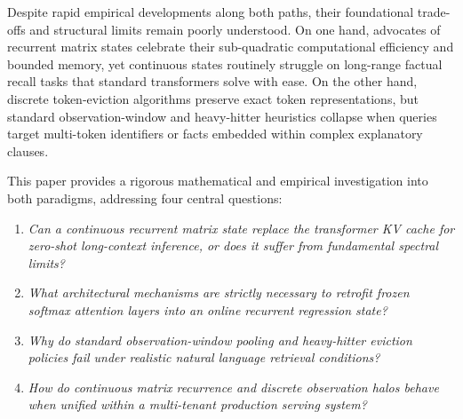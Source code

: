 \documentclass[11pt,a4paper]{article}
\begin{document}
Despite rapid empirical developments along both paths, their foundational trade-offs and structural limits remain poorly understood. On one hand, advocates of recurrent matrix states celebrate their sub-quadratic computational efficiency and bounded memory, yet continuous states routinely struggle on long-range factual recall tasks that standard transformers solve with ease. On the other hand, discrete token-eviction algorithms preserve exact token representations, but standard observation-window and heavy-hitter heuristics collapse when queries target multi-token identifiers or facts embedded within complex explanatory clauses.

This paper provides a rigorous mathematical and empirical investigation into both paradigms, addressing four central questions:
\begin{enumerate}[leftmargin=*]
    \item \textit{Can a continuous recurrent matrix state replace the transformer KV cache for zero-shot long-context inference, or does it suffer from fundamental spectral limits?}
    \item \textit{What architectural mechanisms are strictly necessary to retrofit frozen softmax attention layers into an online recurrent regression state?}
    \item \textit{Why do standard observation-window pooling and heavy-hitter eviction policies fail under realistic natural language retrieval conditions?}
    \item \textit{How do continuous matrix recurrence and discrete observation halos behave when unified within a multi-tenant production serving system?}
\end{enumerate}
\end{document}
